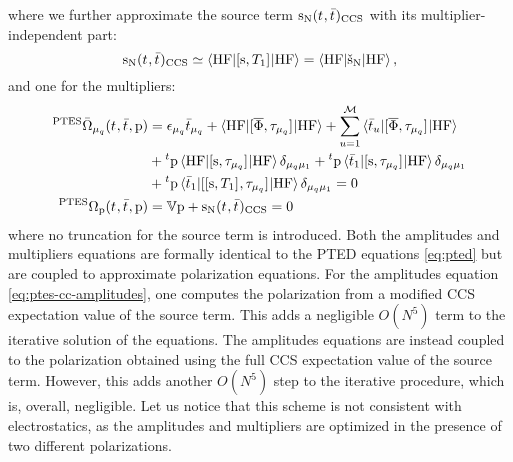 where we further approximate the source term
$\mathrm{s}_{\mathrm{N}}(t_{},\bar{t}_{})_\mathrm{CCS}$ with its
multiplier-independent part:
\begin{equation}\label{eq:pte-s-source}
  \mathrm{s}_{\mathrm{N}}(t_{}, \bar{t}_{})_\mathrm{CCS}
  \simeq
  \braket{\mathrm{HF} | [ \mathrm{s}, T_1 ]^{} | \mathrm{HF}}
  =
  \braket{\mathrm{HF} | \check{\mathrm{s}}_{\mathrm{N}} | \mathrm{HF}},
\end{equation}
and one for the multipliers:
\begin{subequations}\label{eq:ptes-mult}
  \begin{align}
   {}^{\mathrm{PTES}}\bar{\Omega}_{\mu_q}(t_{}, \bar{t}_{}, \mathrm{p})
    &=
    \epsilon_{\mu_q}\bar{t}_{\mu_q} +
    \braket{\mathrm{HF} | [ \overline{\Phi}, \tau_{\mu_q} ]^{} | \mathrm{HF}} +
    \sum_{u=1}^{\mathcal{M}}\braket{\bar{t}_{u} |
    [ \overline{\Phi}, \tau_{\mu_q} ]^{} | \mathrm{HF}}
    \nonumber \\
    &+
    {}^t\mathrm{p}\braket{\mathrm{HF} | [ \mathrm{s}, \tau_{\mu_q} ]^{} | \mathrm{HF}}\delta_{\mu_q\mu_1}
    +
    {}^t\mathrm{p}\braket{\bar{t}_{1} |
    [ \mathrm{s}, \tau_{\mu_q} ]^{} | \mathrm{HF}}\delta_{\mu_q\mu_1}
     \nonumber \\
    &+
    {}^t\mathrm{p}\braket{\bar{t}_{1} |
    [ [ \mathrm{s}, T_1 ]^{}, \tau_{\mu_q} ]^{} | \mathrm{HF}}\delta_{\mu_q\mu_1}
             = 0 \label{eq:ptes-cc-multipliers} \\
    {}^{\mathrm{PTES}}\Omega_{\mathrm{p}}(t_{}, \bar{t}_{}, \mathrm{p})
    &=
    \mathbb{V}\mathrm{p} + \mathrm{s}_{\mathrm{N}}(t_{}, \bar{t}_{})_\mathrm{CCS} = 0
    \label{eq:ptes-cc-polarization-mult}
  \end{align}
\end{subequations}
where no truncation for the source term is introduced.
Both the amplitudes and multipliers equations are formally identical to
the \acrshort*{PTED} equations \eqref{eq:pted} but are coupled to
approximate polarization equations.
For the amplitudes equation \eqref{eq:ptes-cc-amplitudes}, one computes
the polarization from a modified \acrshort*{CCS} expectation value of
the source term. This adds a negligible $O(N^5)$ term to the iterative
solution of the equations.
The amplitudes equations are instead coupled to the polarization
obtained using the full \acrshort*{CCS} expectation value of the source
term. However, this adds another $O(N^5)$ step to the iterative
procedure, which is, overall, negligible.
Let us notice that this scheme is not consistent with electrostatics, as
the amplitudes and multipliers are optimized in the presence of two
different polarizations.

